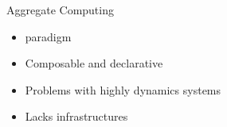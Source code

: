 \begin{frame}{Aggregate Computing~\cite{aggregatecomputing}}
  \begin{cardTiny}
    \begin{itemize}
      \item[\success{\faThumbsUp}]  paradigm
      \item[\success{\faThumbsUp}] Composable and declarative 
      \item[{\color{materialRed} \faThumbsDown}] Problems with highly dynamics systems
      \item[{\color{materialRed} \faThumbsDown}] Lacks infrastructures
    \end{itemize}
  \end{cardTiny}

  \begin{columns}
    \begin{column}{0.51\textwidth}
    \end{column}
    \begin{column}{0.35\textwidth}
    \end{column}
  \end{columns}
\end{frame}
